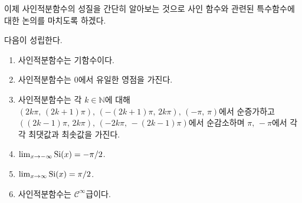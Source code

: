 이제 사인적분함수의 성질을 간단히 알아보는 것으로 사인 함수와 관련된 특수함수에 대한 논의를 마치도록 하겠다.

\begin{theorem}
    다음이 성립한다.
    \begin{enumerate}
        \item 사인적분함수는 기함수이다.
        \item 사인적분함수는 $0$에서 유일한 영점을 가진다.
        \item 사인적분함수는 각 $k\in\mathbb{N}$에 대해 $(2k\pi,\,(2k+1)\pi),\,(-(2k+1)\pi,\,2k\pi),\,(-\pi,\,\pi)$에서 순증가하고 $((2k-1)\pi,\,2k\pi),\,(-2k\pi,\,-(2k-1)\pi)$에서 순감소하며 $\pi,\,-\pi$에서 각각 최댓값과 최솟값을 가진다.
        \item $\lim_{x\to-\infty}\mathrm{Si}(x)=-\pi/2$.
        \item $\lim_{x\to\infty}\mathrm{Si}(x)=\pi/2$.
        \item 사인적분함수는 $\mathcal{C}^\infty$급이다.
    \end{enumerate}
\end{theorem}


